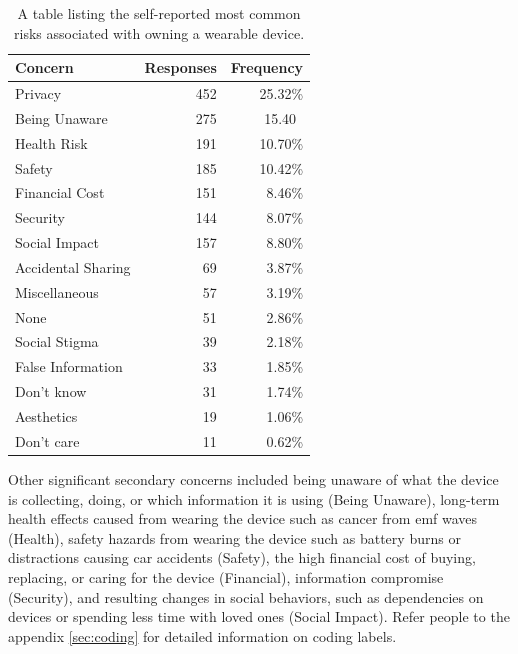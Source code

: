 \documentclass{acm_proc_article-sp}
\begin{document}
\begin{table}[h]
\begin{center}
\begin{tabular}{|l|r|r|}
\hline
Concern &  Responses &  Frequency   \\
\hline
Privacy & 452 & 25.32\% \\
Being Unaware & 275 & 15.40\ \\
Health Risk & 191 & 10.70\%\\
Safety & 185 & 10.42\%\\
Financial Cost & 151 & 8.46\%\\
Security &	144 & 8.07\%\\
Social Impact &	157 & 8.80\%\\
Accidental Sharing &	69 & 3.87\%\\
Miscellaneous &	57 & 3.19\%\\
None	& 51 & 2.86\%\\
Social Stigma &	39 & 2.18\%\\
False Information & 33 & 1.85\%\\
Don't know & 31 & 1.74\%\\
Aesthetics 	& 19 & 1.06\%\\
Don't care 	& 11 & 0.62\%\\
\hline
\end{tabular}
\caption{A table listing the self-reported most common risks associated with owning a wearable device.}
\label{open-responses}
\end{center}
\end{table}

Other significant secondary concerns included being unaware of what the device is collecting, doing, or which information it is using (Being Unaware), long-term health effects caused from wearing the device such as cancer from emf waves (Health), safety hazards from wearing the device such as battery burns or distractions causing car accidents (Safety), the high financial cost of buying, replacing, or caring for the device (Financial),  information compromise (Security), and resulting changes in social behaviors, such as dependencies on devices or spending less time with loved ones (Social Impact). Refer people to the appendix \ref{sec:coding} for detailed information on coding labels. 
\end{document}
